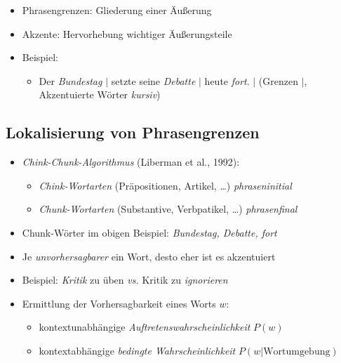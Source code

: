 \documentclass[11pt]{book}
\begin{document}
  \begin{itemize}
  \item Phrasengrenzen: Gliederung einer Äußerung
  \item Akzente: Hervorhebung wichtiger Äußerungsteile
  \item Beispiel: 
  \begin{itemize}
  \item Der \emph{Bundestag} $|$ setzte seine \emph{Debatte} $|$ heute \emph{fort}. $|$ (Grenzen $|$, Akzentuierte Wörter \emph{kursiv})
  \end{itemize}
  \end{itemize}

  \subsection*{Lokalisierung von Phrasengrenzen}
  
  \begin{itemize}
  \item \emph{Chink-Chunk-Algorithmus} (Liberman et al., 1992):
  \begin{itemize}
  	\item \emph{Chink-Wortarten} (Präpositionen, Artikel, \ldots) \emph{phraseninitial}
  	\item \emph{Chunk-Wortarten} (Substantive, Verbpatikel, \ldots) \emph{phrasenfinal}
  \end{itemize}
  \item Chunk-Wörter im obigen Beispiel: \emph{Bundestag, Debatte, fort}
  \end{itemize}

  \begin{itemize}
  \item Je \emph{unvorhersagbarer} ein Wort, desto eher ist es akzentuiert
  \item Beispiel: \emph{Kritik} zu üben \emph{vs.} Kritik zu \emph{ignorieren}
  \item Ermittlung der Vorhersagbarkeit eines Worts $w$:
  \begin{itemize}
  \item kontextunabhängige \emph{Auftretenswahrscheinlichkeit} $P(w)$ 
  \item kontextabhängige \emph{bedingte Wahrscheinlichkeit} $P(w|\textrm{Wortumgebung})$
  \end{itemize}
  \end{itemize}

\end{document}

